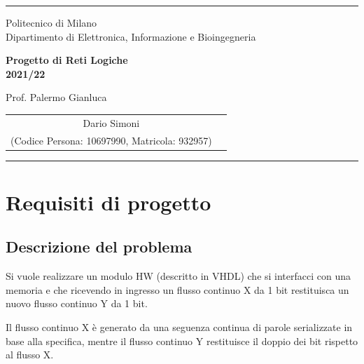 \documentclass{article}
\begin{document}
\setlength\parindent{0pt} %
\setlength\parskip{1em}

\begin{titlepage}
    \centering
    \hrule

    \vspace{0,5cm}
    {
        \normalsize Politecnico di Milano\\
        Dipartimento di Elettronica, Informazione e Bioingegneria
    }

    \vspace{5cm}
    {\Huge \textbf{Progetto di Reti Logiche\\
            2021/22}\\}

    \vspace{0,5cm}
    \large {Prof. Palermo Gianluca}

    \vspace{5cm}
    {
        \large
        \begin{tabular}{c c}
            Dario Simoni \\
            (Codice Persona: 10697990, Matricola: 932957) \\
        \end{tabular}

    }

    \vspace{6.5cm}


    \hrule

\end{titlepage}

\pagebreak

\tableofcontents

\pagebreak

\section{Requisiti di progetto} %
\subsection{Descrizione del problema} %
Si vuole realizzare un modulo HW (descritto in VHDL) che si interfacci con una memoria e che
ricevendo in ingresso un flusso continuo X da 1 bit restituisca un nuovo flusso continuo Y da 1 bit.
\par
Il flusso continuo X è generato da una seguenza continua di parole serializzate in base alla specifica, mentre il flusso continuo Y restituisce il doppio dei bit rispetto al flusso X.
\vspace{0,2cm} %
\end{document}
